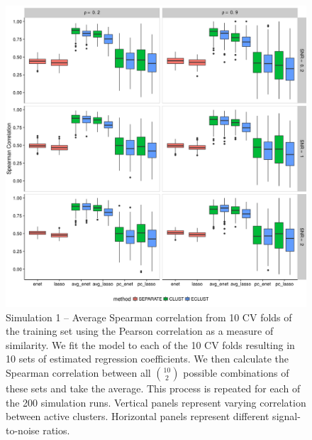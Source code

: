 \begin{appendices}
\begin{figure}[H]
	\centering
	\includegraphics[scale=0.6, keepaspectratio]{./figs/hydra/results/figures/sim1-sept10/spearman_Correlation_sim1.png}
	\caption{Simulation 1 -- Average Spearman correlation from 10 CV folds of the training set using the Pearson correlation as a measure of similarity. We fit the model to each of the 10 CV folds resulting in 10 sets of estimated regression coefficients. We then calculate the Spearman correlation between all $\binom{10}{2}$ possible combinations of these sets and take the average. This process is repeated for each of the 200 simulation runs. Vertical panels represent varying correlation between active clusters. Horizontal panels represent different signal-to-noise ratios.}
	\label{fig:spearman_Correlation_sim1}
\end{figure}



\end{appendices}
